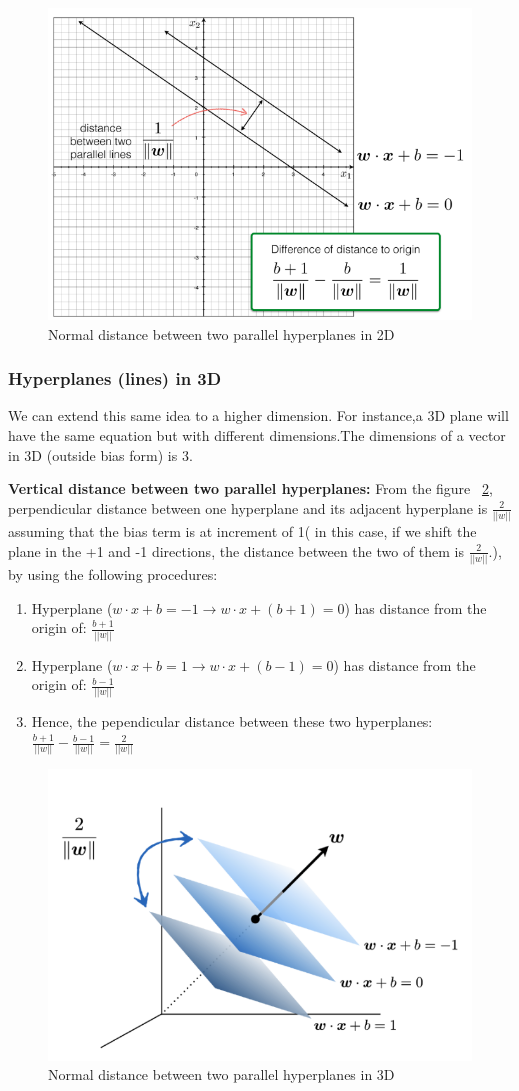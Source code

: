 \documentclass[11pt]{article}
\begin{document}
\begin{itemize}
{\begin{figure}[H]
  \centering
  \includegraphics[width=.48\linewidth]{two_lines.png}
  \caption{Normal distance between two parallel hyperplanes in 2D}
  \label{fig:sfig4}
\end{figure}

}
\end{itemize}

\subsubsection{Hyperplanes (lines) in 3D}
We can extend this same idea to a higher dimension. For instance,a 3D plane will have the same equation but with different dimensions.The dimensions of a vector in 3D (outside bias form) is 3.

\textbf{Vertical distance between two parallel hyperplanes:} From the figure ~\ref{fig:sfig5}, perpendicular distance between one hyperplane and its adjacent hyperplane is $\frac{2}{||w||}$ assuming that the bias term is at increment of 1( in this case, if we shift the plane in the +1 and -1 directions, the distance between the two of them is $\frac{2}{||w||}$.), by using the following procedures:
\begin{enumerate}
    \item Hyperplane ($w \cdot x + b = -1 \rightarrow w \cdot x + (b+1) = 0$) has distance from the origin of: $\frac{b+1}{||w||}$
     \item Hyperplane ($w \cdot x + b = 1 \rightarrow w \cdot x + (b-1) = 0$) has distance from the origin of: $\frac{b-1}{||w||}$
    \item Hence, the pependicular distance between these two hyperplanes: $\frac{b+1}{||w||} - \frac{b-1}{||w||} = \frac{2}{||w||}$
\end{enumerate}

\begin{figure}[H]
  \centering
  \includegraphics[width=.49\linewidth]{two_parallel.png}
  \caption{Normal distance between two parallel hyperplanes in 3D}
  \label{fig:sfig5}
\end{figure}
\end{document}
